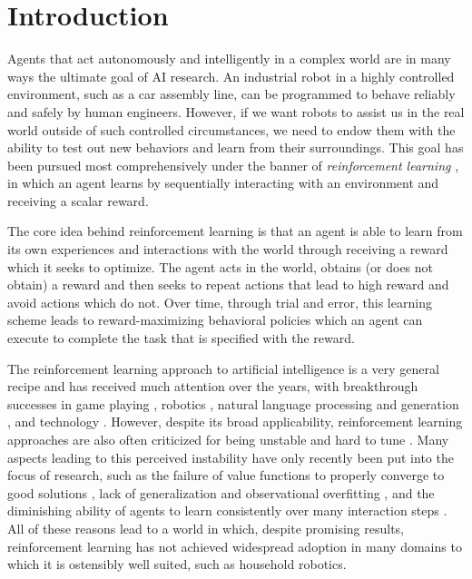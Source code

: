 \chapter{Introduction}

Agents that act autonomously and intelligently in a complex world are in many ways the ultimate goal of AI research.
An industrial robot in a highly controlled environment, such as a car assembly line, can be programmed to behave reliably and safely by human engineers.
However, if we want robots to assist us in the real world outside of such controlled circumstances, we need to endow them with the ability to test out new behaviors and learn from their surroundings.
This goal has been pursued most comprehensively under the banner of \emph{reinforcement learning} \parencite{suttonbook}, in which an agent learns by sequentially interacting with an environment and receiving a scalar reward.

The core idea behind reinforcement learning is that an agent is able to learn from its own experiences and interactions with the world through receiving a reward which it seeks to optimize.
The agent acts in the world, obtains (or does not obtain) a reward and then seeks to repeat actions that lead to high reward and avoid actions which do not.
Over time, through trial and error, this learning scheme leads to reward-maximizing behavioral policies which an agent can execute to complete the task that is specified with the reward.

The reinforcement learning approach to artificial intelligence is a very general recipe and has received much attention over the years, with breakthrough successes in game playing \parencite{mnih2013playing,silver2016mastering}, robotics \parencite{smith2023demonstrating}, natural language processing and generation \parencite{ouyang2022training,rafailov2023direct,bi2024deepseek}, and technology \parencite{degrave2022magnetic}.
However, despite its broad applicability, reinforcement learning approaches are also often criticized for being unstable and hard to tune \parencite{irpan2018deep,patterson2024empirical}.
Many aspects leading to this perceived instability have only recently been put into the focus of research, such as the failure of value functions to properly converge to good solutions \parencite{kumar2021implicit}, lack of generalization and observational overfitting \parencite{song2020observational,kirk2023survey}, and the diminishing ability of agents to learn consistently over many interaction steps \parencite{nikishin2022primacy,hussing2024dissecting}.
All of these reasons lead to a world in which, despite promising results, reinforcement learning has not achieved widespread adoption in many domains to which it is ostensibly well suited, such as household robotics.


